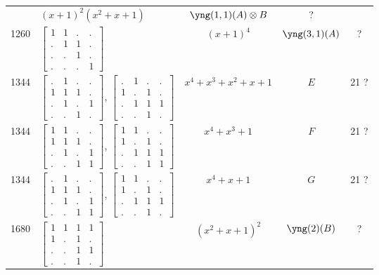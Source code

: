 \documentclass[11pt,oneside]{article}
\newcommand{\tensor}{\otimes}
\begin{document}
\begin{center}
\begin{tabular}{r|l|c|c|c}
  & $(x+1)^2(x^2+x+1)$  & $\yng(1,1)(A)\tensor B$ & ?  \\
1260  & $\begin{bmatrix}1&1&.&.\\.&1&1&.\\.&.&1&.\\.&.&.&1\end{bmatrix}$  & $(x+1)^4$  & $\yng(3,1)(A)$ & ?  \\
1344  & 
$\begin{bmatrix}.&1&.&.\\1&1&1&.\\.&1&.&1\\.&.&1&.\end{bmatrix}$,
$\begin{bmatrix}.&1&.&.\\1&.&1&.\\.&1&1&1\\.&.&1&.\end{bmatrix}$
& $x^4+x^3+x^2+x+1$  & $E$ & 21 ?  \\
1344  & 
$\begin{bmatrix}1&1&.&.\\1&1&1&.\\.&1&.&1\\.&.&1&1\end{bmatrix}$,
$\begin{bmatrix}1&1&.&.\\1&.&1&.\\.&1&1&1\\.&.&1&1\end{bmatrix}$
& $x^4+x^3+1$        & $F$ & 21 ?  \\
1344  & 
$\begin{bmatrix}.&1&.&.\\1&1&1&.\\.&1&.&1\\.&.&1&1\end{bmatrix}$,
$\begin{bmatrix}1&1&.&.\\1&.&1&.\\.&1&1&1\\.&.&1&.\end{bmatrix}$
& $x^4+x+1$          & $G$ & 21 ?  \\
1680  & $\begin{bmatrix}1&1&1&1\\1&.&1&.\\.&.&1&1\\.&.&1&.\end{bmatrix}$  & $(x^2+x+1)^2$  & $\yng(2)(B)$ & ?  \\

\end{tabular}
\end{center}
\end{document}
